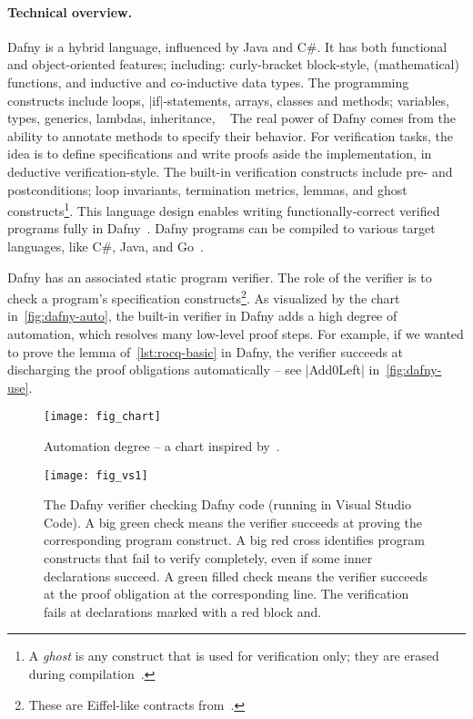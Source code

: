 \paragraph*{Technical overview.}
Dafny is a hybrid language, influenced by Java and C\#.
It has both functional and object-oriented features;
including: curly-bracket block-style, (mathematical) functions, and inductive and co-inductive data types.
The programming constructs include loops, \pr|if|-statements, arrays, classes and methods;
variables, types, generics, lambdas, inheritance, \etc~\cite{dafnydoc}
The real power of Dafny comes from the ability to annotate methods to specify their behavior.
For verification tasks, the idea is to define specifications and write proofs aside the implementation, in deductive verification-style.
The built-in verification constructs include pre- and postconditions;
loop invariants, termination metrics, lemmas, and ghost constructs\footnote{
A \emph{ghost} is any construct that is used for verification only; they are erased during compilation~\cite[p. 19]{leino2023}.}.
This language design enables writing functionally-correct verified programs fully in Dafny~\cite{leino2023}.
Dafny programs can be compiled to various target languages, like C\#, Java, and Go~\cite{dafnydoc}.

Dafny has an associated static program verifier.
The role of the verifier is to check a program's specification constructs\footnote{These are Eiffel-like contracts from~\cite{meyer1988}.}.
As visualized by the chart in~\autoref{fig:dafny-auto},
the built-in verifier in Dafny adds a high degree of automation, which resolves many low-level proof steps.
For example, if we wanted to prove the lemma of~\autoref{lst:rocq-basic} in Dafny, the verifier succeeds at discharging the proof obligations automatically -- see \pr|Add0Left| in~\autoref{fig:dafny-use}.

\begin{figure}[ht]
\centering
\texttt{[image: fig\_chart]}
\caption[Automation degree chart]{Automation degree -- a chart inspired by~\cite{leino2010b}.}
\label{fig:dafny-auto}
\end{figure}

\begin{figure}[p]
\begin{center}
\texttt{[image: fig\_vs1]}
\end{center}
\caption[Dafny running in Visual Studio Code]{
The Dafny verifier checking Dafny code (running in Visual Studio Code).
A big green check{ }{ }\circledb[dafnyok]{\faCheck}{ }means the verifier succeeds at proving the corresponding program construct.
A big red cross{ }{ }\circledb[dafnyno]{\scalebox{1.25}{\faTimes}}{ }identifies program constructs that fail to verify completely, even if some inner declarations succeed.
A green filled check {\color{dafnyok}{\scalebox{.8}{\faCheckCircle}}} means the verifier succeeds at the proof obligation at the corresponding line.
The verification fails at declarations marked with a red block  and\;\;.
}\label{fig:dafny-use}
\end{figure}

